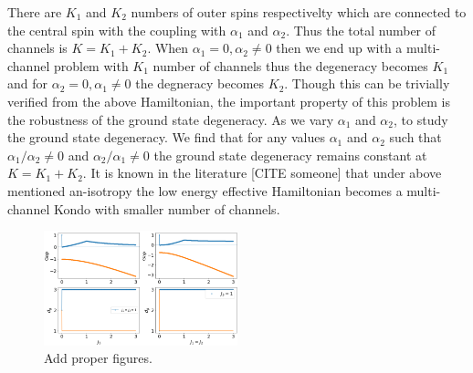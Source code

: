 \documentclass[reprint,prb,superscriptaddress]{revtex4-1}
\begin{document}
%
%
%
There are $K_1$ and $K_2$ numbers of outer spins respectivelty which are connected to the central spin with the coupling with $\alpha_1$ and $\alpha_2$. Thus the total number of channels is $K=K_1+K_2$. When $\alpha_1=0, \alpha_2\neq 0$ then we end up with a multi-channel problem with $K_1$ number of channels thus the degeneracy becomes $K_1$ and for $\alpha_2=0, \alpha_1\neq 0$ the degneracy becomes $K_2$. Though this can be trivially verified from the above Hamiltonian, the important property of this problem is the robustness of the ground state degeneracy. As we vary $\alpha_1$ and $\alpha_2$, to study the ground state degeneracy. We find that for any values $\alpha_1$  and $\alpha_2$ such that $\alpha_1/\alpha_2\neq 0$ and $\alpha_2/\alpha_1\neq 0$ the ground state degeneracy remains constant at $K=K_1+K_2$. It is known in the literature [CITE someone] that under above mentioned an-isotropy the low energy effective Hamiltonian becomes a multi-channel Kondo with smaller number of channels.

\begin{figure}\centering
\includegraphics[width=0.5\textwidth]{plt/Anisotropy_Channel:3}
\caption{Add proper figures.}
\end{figure}
\end{document}
